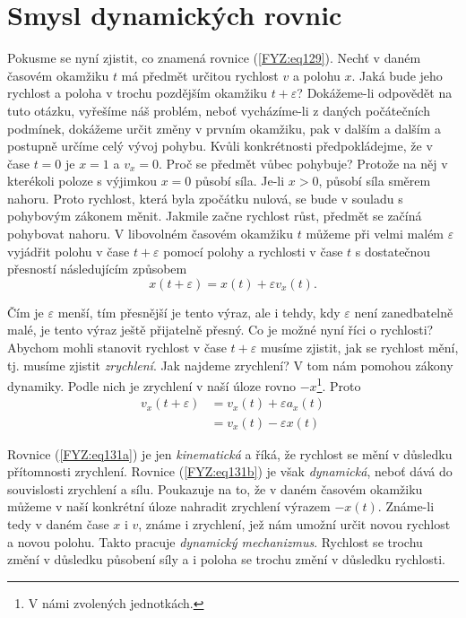 {{  \section{Smysl dynamických rovnic}
    Pokusme se nyní zjistit, co znamená rovnice (\ref{FYZ:eq129}). Nechť v daném časovém okamžiku 
    \(t\) má předmět určitou rychlost \(v\) a polohu \(x\). Jaká bude jeho rychlost a poloha v 
    trochu pozdějším okamžiku \(t+\varepsilon\)? Dokážeme-li odpovědět na tuto otázku, vyřešíme náš 
    problém, neboť vycházíme-li z daných počátečních podmínek, dokážeme určit změny v prvním 
    okamžiku, pak v dalším a dalším a postupně určíme celý vývoj pohybu. Kvůli konkrétnosti 
    předpokládejme, že v čase \(t = 0\) je \(x= 1\) a \(v_x = 0\). Proč se předmět vůbec pohybuje? 
    Protože na něj v kterékoli poloze s výjimkou \(x=0\) působí síla. Je-li \(x > 0\), působí síla 
    směrem nahoru. Proto rychlost, která byla zpočátku nulová, se bude v souladu s pohybovým 
    zákonem měnit. Jakmile začne rychlost růst, předmět se začíná pohybovat nahoru. V libovolném 
    časovém okamžiku \(t\) můžeme při velmi malém \(\varepsilon\) vyjádřit polohu v čase \(t + 
    \varepsilon\) pomocí polohy a rychlosti v čase \(t\) s dostatečnou přesností následujícím 
    způsobem
    \begin{equation}\label{FYZ:eq130}
      x(t+\varepsilon) = x(t) + \varepsilon v_x(t).
    \end{equation}
    
    Čím je \(\varepsilon\) menší, tím přesnější je tento výraz, ale i tehdy, kdy \(\varepsilon\) 
    není zanedbatelně malé, je tento výraz ještě přijatelně přesný. Co je možné nyní říci o 
    rychlosti? Abychom mohli stanovit rychlost v čase \(t + \varepsilon\) musíme zjistit, jak se 
    rychlost mění, tj. musíme zjistit \emph{zrychlení}. Jak najdeme zrychlení? V tom nám pomohou 
    zákony dynamiky. Podle nich je zrychlení v naší úloze rovno \(-x\)\footnote{V námi zvolených 
    jednotkách.}. Proto
    \begin{subequations}
      \label{FYZ:eq131} 
      \begin{align}
        v_x(t+\varepsilon) &= v_x(t) + \varepsilon a_x(t)  \label{FYZ:eq131a}        \\
                           &= v_x(t) - \varepsilon x(t)    \label{FYZ:eq131b}
      \end{align}
    \end{subequations} 
    
    Rovnice (\ref{FYZ:eq131a}) je jen \emph{kinematická} a říká, že rychlost se mění v důsledku 
    přítomnosti zrychlení. Rovnice (\ref{FYZ:eq131b}) je však \emph{dynamická}, neboť dává do 
    souvislosti zrychlení a sílu. Poukazuje na to, že v daném časovém okamžiku můžeme v naší 
    konkrétní úloze nahradit zrychlení výrazem \(-x(t)\). Známe-li tedy v daném čase \(x\) i \(v\), 
    známe i zrychlení, jež nám umožní určit novou rychlost a novou polohu. Takto pracuje 
    \emph{dynamický mechanizmus}. Rychlost se trochu změní v důsledku působení síly a i poloha se 
    trochu změní v důsledku rychlosti.
     
}}
